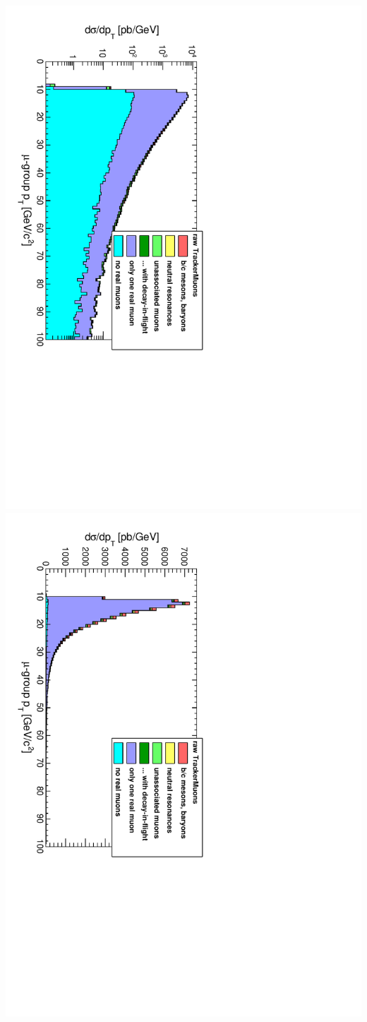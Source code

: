 \documentclass[compress]{beamer}
\begin{document}
\begin{frame}
\includegraphics[height=0.5\linewidth, angle=90]{ptlog_PlainTrackerMuonAny.pdf}
\includegraphics[height=0.5\linewidth, angle=90]{ptlinear_PlainTrackerMuonAny.pdf}
\end{frame}
\end{document}
